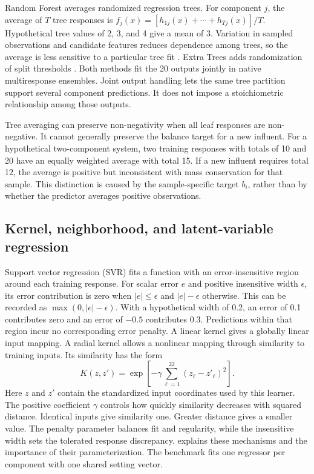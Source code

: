 Random Forest averages randomized regression trees. For component $j$, the average of $T$ tree responses is $f_j(x)=[h_{1j}(x)+\cdots+h_{Tj}(x)]/T$. Hypothetical tree values of 2, 3, and 4 give a mean of 3. Variation in sampled observations and candidate features reduces dependence among trees, so the average is less sensitive to a particular tree fit \citep{Breiman2001}. Extra Trees adds randomization of split thresholds \citep{Geurts2006}. Both methods fit the 20 outputs jointly in native multiresponse ensembles. Joint output handling lets the same tree partition support several component predictions. It does not impose a stoichiometric relationship among those outputs.

Tree averaging can preserve non-negativity when all leaf responses are non-negative. It cannot generally preserve the balance target for a new influent. For a hypothetical two-component system, two training responses with totals of 10 and 20 have an equally weighted average with total 15. If a new influent requires total 12, the average is positive but inconsistent with mass conservation for that sample. This distinction is caused by the sample-specific target $b_i$, rather than by whether the predictor averages positive observations.

\subsection{Kernel, neighborhood, and latent-variable regression}

Support vector regression (SVR) fits a function with an error-insensitive region around each training response. For scalar error $e$ and positive insensitive width $\epsilon$, its error contribution is zero when $|e|\leq\epsilon$ and $|e|-\epsilon$ otherwise. This can be recorded as $\max(0,|e|-\epsilon)$. With a hypothetical width of 0.2, an error of 0.1 contributes zero and an error of $-0.5$ contributes 0.3. Predictions within that region incur no corresponding error penalty. A linear kernel gives a globally linear input mapping. A radial kernel allows a nonlinear mapping through similarity to training inputs. Its similarity has the form
\[
K(z,z')=\exp\!\left[-\gamma\sum_{\ell=1}^{22}(z_\ell-z'_\ell)^2\right].
\]
Here $z$ and $z'$ contain the standardized input coordinates used by this learner. The positive coefficient $\gamma$ controls how quickly similarity decreases with squared distance. Identical inputs give similarity one. Greater distance gives a smaller value. The penalty parameter balances fit and regularity, while the insensitive width sets the tolerated response discrepancy. \citet{SmolaScholkopf2004} explains these mechanisms and the importance of their parameterization. The benchmark fits one regressor per component with one shared setting vector.

